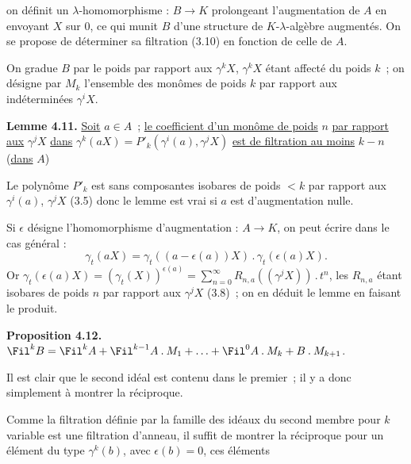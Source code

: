 
on
définit un \(\lambda\)-homomorphisme : \(B\to K\) prolongeant l'augmentation de \(A\) en envoyant \(X\) sur \(0\), ce qui munit \(B\) d'une structure de \(K\)-\(\lambda\)-algèbre augmentés. On se propose de déterminer sa filtration (3.10) en fonction de celle de \(A\).

On gradue \(B\) par le poids par rapport aux \(\gamma^k X\), \(\gamma^k X\) étant affecté du poids \(k\)~; on désigne par \(M_k\) l'ensemble des monômes de poids \(k\) par rapport aux indéterminées \(\gamma^i X\).

\textbf{Lemme 4.11.} \uline{Soit} \(a\in A\)~; \uline{le coefficient d'un monôme de poids} \(n\) \uline{par rapport} \uline{aux} \(\gamma^j X\) \uline{dans} \(\gamma^k(aX)=P'_k(\gamma^i(a),\gamma^j X)\) \uline{est de filtration au moins} \(k-n\) (\uline{dans} \(A\))

Le polynôme \(P'_k\) est sans composantes isobares de poids \(<k\) par rapport aux \(\gamma^i(a)\), \(\gamma^j X\) (3.5) donc le lemme est vrai si \(a\) est d'augmentation nulle.

Si \(\epsilon\) désigne l'homomorphisme d'augmentation : \(A\to K\), on peut écrire dans le cas général :
\[
  \gamma_t(aX)=\gamma_t((a-\epsilon(a))X)\mathbin{.}\gamma_t(\epsilon(a)X).
\]
Or \(\gamma_t(\epsilon(a)X)=(\gamma_t(X))^{\epsilon(a)}=\sum_{n=0}^{\infty}R_{n,a}((\gamma^j X))\mathbin{.}t^n\), les \(R_{n,a}\) étant isobares de poids \(n\) par rapport aux \(\gamma^j X\) (3.8)~; on en déduit le lemme en faisant le produit.

\textbf{Proposition 4.12.} \(\Fil^k B=\Fil^k A+\Fil^{k-1}A\mathbin{.}M_1+\ldots+\Fil^0 A\mathbin{.}M_k+B\mathbin{.}M_{k+1}\).

Il est clair que le second idéal est contenu dans le premier~; il y a donc simplement à montrer la réciproque.

Comme la filtration définie par la famille des idéaux du second membre pour \(k\) variable est une filtration d'anneau, il suffit de montrer la réciproque pour un élément du type \(\gamma^k(b)\), avec \(\epsilon(b)=0\), ces éléments
